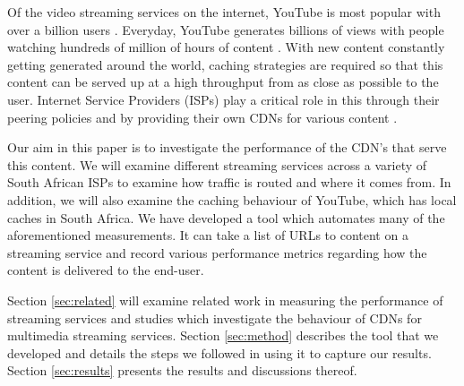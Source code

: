 \documentclass{sig-alternate-05-2015}
\begin{document}
Of the video streaming services on the internet, YouTube is most popular with over a billion users \cite{youtubeStats}. Everyday, YouTube generates billions of views with people watching hundreds of million of hours of content \cite{youtubeStats}. With new content constantly getting generated around the world, caching strategies are required so that this content can be served up at a high throughput from as close as possible to the user. Internet Service Providers (ISPs) play a critical role in this through their peering policies and by providing their own CDNs for various content \cite{Labovitz:2010:IIT:2043164.1851194}.

Our aim in this paper is to investigate the performance of the CDN's that serve this content. We will examine different streaming services across a variety of South African ISPs to examine how traffic is routed and where it comes from. In addition, we will also examine the caching behaviour of YouTube, which has local caches in South Africa. We have developed a tool which automates many of the aforementioned measurements. It can take a list of URLs to content on a streaming service and record various performance metrics regarding how the content is delivered to the end-user.

Section \ref{sec:related} will examine related work in measuring the performance of streaming services and studies which investigate the behaviour of CDNs for multimedia streaming services. Section \ref{sec:method} describes the tool that we developed and details the steps we followed in using it to capture our results. Section \ref{sec:results} presents the results and discussions thereof.
\end{document}
